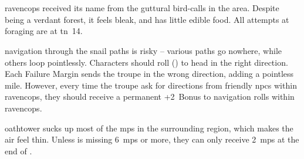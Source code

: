 \section{}

\begin{figure}[t!]
  \label{ravencops}
\end{figure}

\noindent
\Gls{ravencops} received its name from the guttural bird-calls in the area.
Despite being a verdant forest, it feels bleak, and has little edible food.
All attempts at \gls{foraging} are at \gls{tn}~14.

\Gls{navigation} through the snail paths is risky -- various paths go nowhere, while others loop pointlessly.
Characters should roll  (\tn[10]) to head in the right direction.
Each Failure Margin sends the troupe in the wrong direction, adding a pointless mile.
However, every time the troupe ask for directions from friendly \glspl{npc} within \gls{ravencops}, they should receive a permanent +2~Bonus to \gls{navigation} rolls within \gls{ravencops}.

\label{oathtowerMPvacuum}
\Gls{oathtower} sucks up most of the \glspl{mp} in the surrounding \gls{region}, which makes the air feel thin.
Unless  is missing 6~\glspl{mp} or more, they can only receive 2~\glspl{mp} at the end of .%



